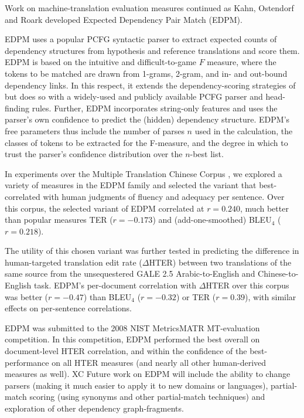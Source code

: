 \documentclass[11pt]{article}
\begin{document}
Work on machine-translation evaluation measures continued as Kahn,
Ostendorf and Roark developed Expected Dependency Pair Match (EDPM).  

EDPM uses a popular PCFG syntactic parser \cite{charniak-johnson:2005:ACL}
to extract expected counts of dependency structures from hypothesis
and reference translations and score them. 
%
EDPM is based on the intuitive and difficult-to-game $F$ measure, where
the tokens to be matched are drawn from 1-grams, 2-gram, and in- and
out-bound dependency links.  In this respect, it extends the
dependency-scoring strategies of \cite{owczarzak07labelleddepseval} but does so
with a widely-used and publicly available PCFG parser and head-finding
rules.  Further, EDPM incorporates string-only features and uses
the parser's own confidence to predict the (hidden) dependency structure.
%
EDPM's free parameters thus include the number of parses $n$ used in the
calculation, the classes of tokens to be extracted for the F-measure,
and the degree in which to trust the parser's confidence distribution
over the $n$-best list.


In experiments over the Multiple Translation Chinese Corpus \cite{LDC03MTC2,LDC06MTC4}, we explored a variety of measures in the EDPM family and
selected the variant that best-correlated with human judgments of
fluency and adequacy per sentence.  Over this corpus, the selected
variant of EDPM correlated at $r=0.240$, much better than popular
measures TER ($r=-0.173$) and (add-one-smoothed) BLEU$_4$ ($r=0.218$).


The utility of this chosen variant was further tested in predicting
the difference in human-targeted translation edit rate ($\Delta$HTER)
between two translations of the same source from the unsequestered
GALE 2.5 \cite{darpa08gale} Arabic-to-English and Chinese-to-English task.
EDPM's per-document correlation with $\Delta$HTER over this corpus was
better ($r=-0.47$) than BLEU$_4$ ($r=-0.32$) or TER ($r=0.39$), with
similar effects on per-sentence correlations.


EDPM was submitted to the 2008 NIST MetricsMATR MT-evaluation
competition. In this competition, EDPM performed the best overall on
document-level HTER correlation, and within the confidence of the
best-performance on all HTER measures (and nearly all other
human-derived measures as well).
XC
Future work on EDPM will include the ability to change parsers (making
it much easier to apply it to new domains or languages), partial-match
scoring (using synonyms and other partial-match techniques) and
exploration of other dependency graph-fragments.



\end{document}

